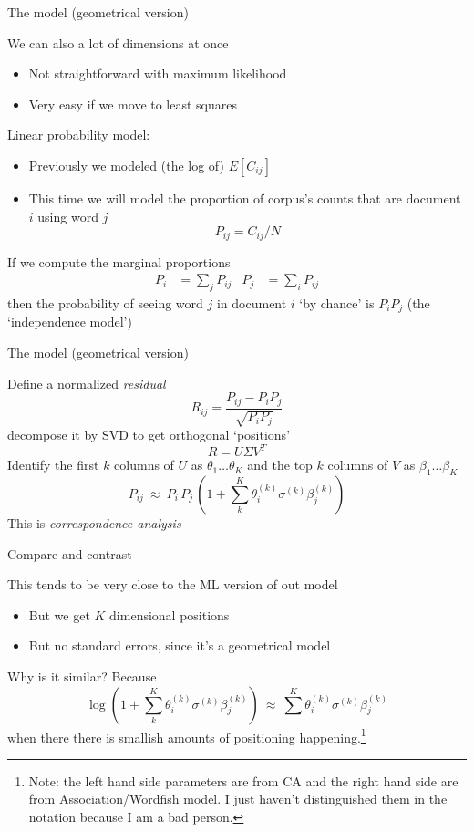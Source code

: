 \documentclass{hertieteaching}
\begin{document}
\begin{frame}{The model (geometrical version)}

We can also a lot of dimensions at once
\begin{itemize}
  \item Not straightforward with maximum likelihood
  \item Very easy if we move to least squares
\end{itemize}

Linear probability model: 
\begin{itemize}
  \item Previously we modeled (the log of) $E[C_\mathit{ij}]$
  \item This time we will model the proportion of corpus's counts that are document $i$ using word $j$
$$
P_\mathit{ij} = C_\mathit{ij} / N
$$
\end{itemize}
If we compute the marginal proportions
\begin{align*}
P_i & = \sum_{j} P_\mathit{ij} & 
P_j & = \sum_{i} P_\mathit{ij} 	
\end{align*}
then the probability of seeing word $j$ in document $i$ `by chance' is
$P_i P_j$ (the `independence model')

\end{frame}
\begin{frame}{The model (geometrical version)}

Define a normalized \textit{residual}
$$ 
R_\mathit{ij} = \frac{P_\mathit{ij} - P_i P_j}{\sqrt{P_i P_j}}
$$
decompose it by SVD to get orthogonal `positions'
$$ 
R = U\Sigma V^{T}
$$
Identify the first $k$ columns of $U$ as $\theta_1\ldots \theta_K$ and
the top $k$ columns of $V$ as $\beta_1\ldots \beta_K$
\bigskip
\pause
$$
P_{ij} ~\approx~ P_{i}\,P_{j}\,\left(1 + \sum^{K}_k \theta^{(k)}_i \sigma^{(k)} \beta^{(k)}_j\right)
$$
This is \textit{correspondence analysis} \parencite{Benzecri1992,Greenacre2007}

\end{frame}
\begin{frame}{Compare and contrast}

This tends to be very close to the ML version of out model
\begin{itemize}
  \item But we get $K$ dimensional positions 
  \item But no standard errors, since it's a geometrical model
\end{itemize}

Why is it similar? Because
$$
\log\left( 1 + \sum^{K}_k \theta^{(k)}_i \sigma^{(k)} \beta^{(k)}_j\right) ~\approx~ \sum^{K} \theta^{(k)}_i \sigma^{(k)} \beta^{(k)}_j
$$
when there there is smallish amounts of positioning happening.\footnote{Note: the left hand side parameters are from CA and the right hand side are from Association/Wordfish model. I just haven't distinguished them in the notation because I am a bad person.}

\end{frame}
\end{document}
